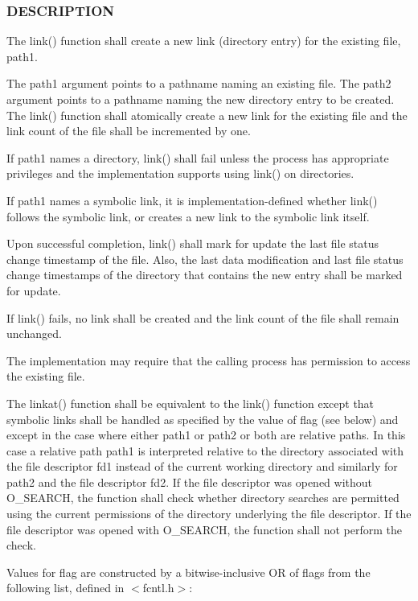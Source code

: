 \subsubsection*{D\+E\+S\+C\+R\+I\+P\+T\+I\+ON}

The link() function shall create a new link (directory entry) for the existing file, path1.

The path1 argument points to a pathname naming an existing file. The path2 argument points to a pathname naming the new directory entry to be created. The link() function shall atomically create a new link for the existing file and the link count of the file shall be incremented by one.

If path1 names a directory, link() shall fail unless the process has appropriate privileges and the implementation supports using link() on directories.

If path1 names a symbolic link, it is implementation-\/defined whether link() follows the symbolic link, or creates a new link to the symbolic link itself.

Upon successful completion, link() shall mark for update the last file status change timestamp of the file. Also, the last data modification and last file status change timestamps of the directory that contains the new entry shall be marked for update.

If link() fails, no link shall be created and the link count of the file shall remain unchanged.

The implementation may require that the calling process has permission to access the existing file.

The linkat() function shall be equivalent to the link() function except that symbolic links shall be handled as specified by the value of flag (see below) and except in the case where either path1 or path2 or both are relative paths. In this case a relative path path1 is interpreted relative to the directory associated with the file descriptor fd1 instead of the current working directory and similarly for path2 and the file descriptor fd2. If the file descriptor was opened without O\+\_\+\+S\+E\+A\+R\+CH, the function shall check whether directory searches are permitted using the current permissions of the directory underlying the file descriptor. If the file descriptor was opened with O\+\_\+\+S\+E\+A\+R\+CH, the function shall not perform the check.

Values for flag are constructed by a bitwise-\/inclusive OR of flags from the following list, defined in $<$fcntl.\+h$>$\+:

